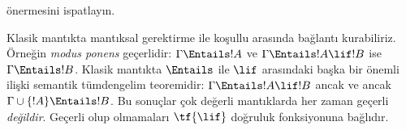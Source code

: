 \begin{prob}
 önermesini ispatlayın.
\end{prob}

Klasik mantıkta mantıksal gerektirme ile koşullu arasında bağlantı
kurabiliriz. Örneğin \emph{modus ponens} geçerlidir: $\Gamma\Entails !A$ ve
$\Gamma\Entails !A\lif !B$ ise $\Gamma\Entails !B$. Klasik mantıkta
$\Entails$ ile $\lif$ arasındaki başka bir önemli ilişki semantik tümdengelim
teoremidir: $\Gamma\Entails !A\lif !B$ ancak ve ancak
$\Gamma\cup\{!A\}\Entails !B$. Bu sonuçlar çok değerli mantıklarda her zaman
geçerli \emph{değildir}. Geçerli olup olmamaları $\tf{\lif}$ doğruluk
fonksiyonuna bağlıdır.

